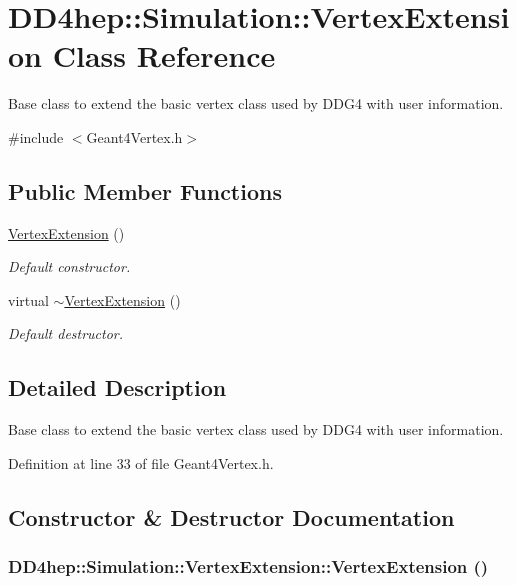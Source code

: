 \hypertarget{class_d_d4hep_1_1_simulation_1_1_vertex_extension}{
\section{DD4hep::Simulation::VertexExtension Class Reference}
\label{class_d_d4hep_1_1_simulation_1_1_vertex_extension}
}


Base class to extend the basic vertex class used by DDG4 with user information.  


{\ttfamily \#include $<$Geant4Vertex.h$>$}\subsection*{Public Member Functions}
\begin{DoxyCompactItemize}
\item 
\hyperlink{class_d_d4hep_1_1_simulation_1_1_vertex_extension_a5e6f2f75331b2ce06e47e37af6d8e413}{VertexExtension} ()
\begin{DoxyCompactList}\small\item\em Default constructor. \item\end{DoxyCompactList}\item 
virtual \hyperlink{class_d_d4hep_1_1_simulation_1_1_vertex_extension_ada5f206230fe61718826c4cfe8eb7e9e}{$\sim$VertexExtension} ()
\begin{DoxyCompactList}\small\item\em Default destructor. \item\end{DoxyCompactList}\end{DoxyCompactItemize}


\subsection{Detailed Description}
Base class to extend the basic vertex class used by DDG4 with user information. 

Definition at line 33 of file Geant4Vertex.h.

\subsection{Constructor \& Destructor Documentation}
\hypertarget{class_d_d4hep_1_1_simulation_1_1_vertex_extension_a5e6f2f75331b2ce06e47e37af6d8e413}{
\subsubsection[{VertexExtension}]{\setlength{\rightskip}{0pt plus 5cm}DD4hep::Simulation::VertexExtension::VertexExtension ()}}
\label{class_d_d4hep_1_1_simulation_1_1_vertex_extension_a5e6f2f75331b2ce06e47e37af6d8e413}


